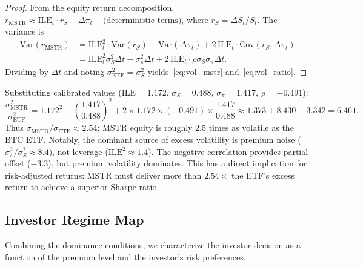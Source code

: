 \begin{proof}
From the equity return decomposition, $r_{\mathrm{MSTR}} \approx \mathrm{ILE}_t \cdot r_S + \Delta\pi_t + \text{(deterministic terms)}$, where $r_S = \Delta S_t / S_t$. The variance is
\begin{align*}
  \mathrm{Var}(r_{\mathrm{MSTR}}) &= \mathrm{ILE}_t^2 \cdot \mathrm{Var}(r_S) + \mathrm{Var}(\Delta\pi_t) + 2\,\mathrm{ILE}_t \cdot \mathrm{Cov}(r_S, \Delta\pi_t) \\
  &= \mathrm{ILE}_t^2 \sigma_S^2 \Delta t + \sigma_\pi^2 \Delta t + 2\,\mathrm{ILE}_t \cdot \rho \sigma_S \sigma_\pi \Delta t.
\end{align*}
Dividing by $\Delta t$ and noting $\sigma_{\mathrm{ETF}}^2 = \sigma_S^2$ yields~\eqref{eq:vol_mstr} and~\eqref{eq:vol_ratio}.
\end{proof}

\begin{remark}
\label{rem:vol_calibrated}
Substituting calibrated values ($\mathrm{ILE} = 1.172$, $\sigma_S = 0.488$, $\sigma_\pi = 1.417$, $\rho = -0.491$):
\[
  \frac{\sigma_{\mathrm{MSTR}}^2}{\sigma_{\mathrm{ETF}}^2} = 1.172^2 + \left(\frac{1.417}{0.488}\right)^2 + 2 \times 1.172 \times (-0.491) \times \frac{1.417}{0.488} \approx 1.373 + 8.430 - 3.342 = 6.461.
\]
Thus $\sigma_{\mathrm{MSTR}} / \sigma_{\mathrm{ETF}} \approx 2.54$: MSTR equity is roughly 2.5 times as volatile as the BTC ETF. Notably, the dominant source of excess volatility is premium noise ($\sigma_\pi^2 / \sigma_S^2 \approx 8.4$), not leverage ($\mathrm{ILE}^2 \approx 1.4$). The negative correlation provides partial offset ($-3.3$), but premium volatility dominates. This has a direct implication for risk-adjusted returns: MSTR must deliver more than $2.54\times$ the ETF's excess return to achieve a superior Sharpe ratio.
\end{remark}

\subsection{Investor Regime Map}
\label{subsec:regime_map}

Combining the dominance conditions, we characterize the investor decision as a function of the premium level and the investor's risk preferences.

